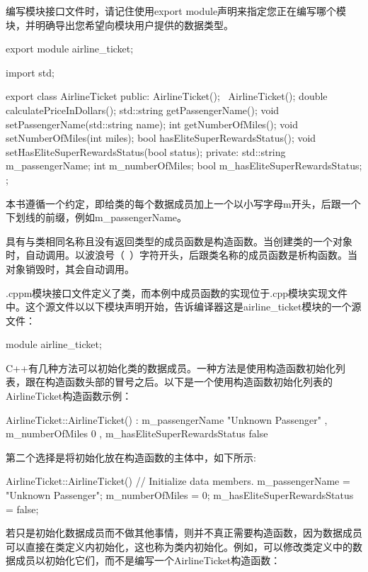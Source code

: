 编写模块接口文件时，请记住使用export module声明来指定您正在编写哪个模块，并明确导出您希望向模块用户提供的数据类型。

\begin{cpp}
export module airline_ticket;

import std;

export class AirlineTicket
{
    public:
        AirlineTicket();
        ~AirlineTicket();
        double calculatePriceInDollars();
        std::string getPassengerName();
        void setPassengerName(std::string name);
        int getNumberOfMiles();
        void setNumberOfMiles(int miles);
        bool hasEliteSuperRewardsStatus();
        void setHasEliteSuperRewardsStatus(bool status);
    private:
        std::string m_passengerName;
        int m_numberOfMiles;
        bool m_hasEliteSuperRewardsStatus;
};
\end{cpp}

本书遵循一个约定，即给类的每个数据成员加上一个以小写字母m开头，后跟一个下划线的前缀，例如m\_passengerName。

具有与类相同名称且没有返回类型的成员函数是构造函数。当创建类的一个对象时，自动调用。以波浪号（~）字符开头，后跟类名称的成员函数是析构函数。当对象销毁时，其会自动调用。

.cppm模块接口文件定义了类，而本例中成员函数的实现位于.cpp模块实现文件中。这个源文件以以下模块声明开始，告诉编译器这是airline\_ticket模块的一个源文件：

\begin{cpp}
module airline_ticket;
\end{cpp}

C++有几种方法可以初始化类的数据成员。一种方法是使用构造函数初始化列表，跟在构造函数头部的冒号之后。以下是一个使用构造函数初始化列表的AirlineTicket构造函数示例：

\begin{cpp}
AirlineTicket::AirlineTicket()
    : m_passengerName { "Unknown Passenger" }
    , m_numberOfMiles { 0 }
    , m_hasEliteSuperRewardsStatus { false }
{}
\end{cpp}

第二个选择是将初始化放在构造函数的主体中，如下所示:

\begin{cpp}
AirlineTicket::AirlineTicket()
{
    // Initialize data members.
    m_passengerName = "Unknown Passenger";
    m_numberOfMiles = 0;
    m_hasEliteSuperRewardsStatus = false;
}
\end{cpp}

若只是初始化数据成员而不做其他事情，则并不真正需要构造函数，因为数据成员可以直接在类定义内初始化，这也称为类内初始化。例如，可以修改类定义中的数据成员以初始化它们，而不是编写一个AirlineTicket构造函数：

